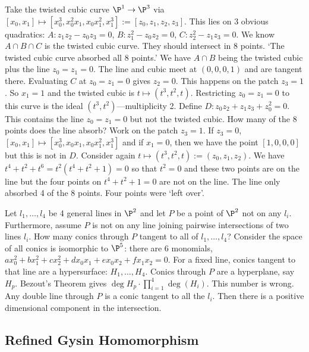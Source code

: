 \begin{ex}
Take the twisted cubic curve $\P^1 \to \P^3$ via $[x_0,x_1] \mapsto [x_0^3,x_0^2x_1,x_0x_1^2,x_1^3]:=[z_0,z_1,z_2,z_3]$.  This lies on 3 obvious quadratics: $A: z_1z_2-z_0z_3=0$, $B: z_1^2-z_0z_2=0$, $C: z_2^2-z_1z_3=0$. We know $A \cap B \cap C$ is the twisted cubic curve. They should intersect in 8 points. `The twisted cubic curve absorbed all 8 points.' We have $A \cap B$ being the twisted cubic plus the line $z_0=z_1=0$. The line and cubic meet at $(0,0,0,1)$ and are tangent there. Evaluating $C$ at $z_0=z_1=0$ gives $z_2=0$. This happens on the patch $z_3=1$. So $x_1=1$ and the twisted cubic is $t \mapsto (t^3,t^2,t)$. Restricting $z_0=z_1=0$ to this curve is the ideal $(t^3,t^2)$---multiplicity 2. Define $D: z_0z_2+z_1z_3+z_0^2=0$. This contains the line $z_0=z_1=0$ but not the twisted cubic. How many of the 8 points does the line absorb? Work on the patch $z_3=1$. If $z_3=0$, $[x_0,x_1] \mapsto [x_0^3,x_0x_1,x_0x_1^2,x_1^3]$ and if $x_1=0$, then we have the point $[1,0,0,0]$ but this is not in $D$. Consider again $t \mapsto (t^3,t^2,t):=(z_0,z_1,z_2)$. We have $ t^4+t^2+t^6=t^2(t^4+t^2+1)=0$ so that $t^2=0$ and these two points are on the line but the four points on $t^4+t^2+1=0$ are not on the line. The line only absorbed 4 of the 8 points. Four points were `left over'. 
\end{ex}


\begin{ex}
Let $l_1,\ldots,l_4$ be 4 general lines in $\P^2$ and let $P$ be a point of $\P^2$ not on any $l_i$. Furthermore, assume $P$ is not on any line joining pairwise intersections of two lines $l_i$. How many conics through $P$ tangent to all of $l_1,\ldots,l_4$? Consider the space of all conics is isomorphic to $\P^5$: there are 6 monomials, $ax_0^2+bx_1^2+cx_2^2+dx_0x_1+ex_0x_2+fx_1x_2=0$. For a fixed line, conics tangent to that line are a hypersurface: $H_1,\ldots,H_4$. Conics through $P$ are a hyperplane, say $H_p$. Bezout's Theorem gives $\deg H_p \cdot \prod_{i=1}^4 \deg(H_i)$. This number is wrong. Any double line through $P$ is a conic tangent to all the $l_i$. Then there is a positive dimensional component in the intersection. 
\end{ex}



\subsection{Refined Gysin Homomorphism}



